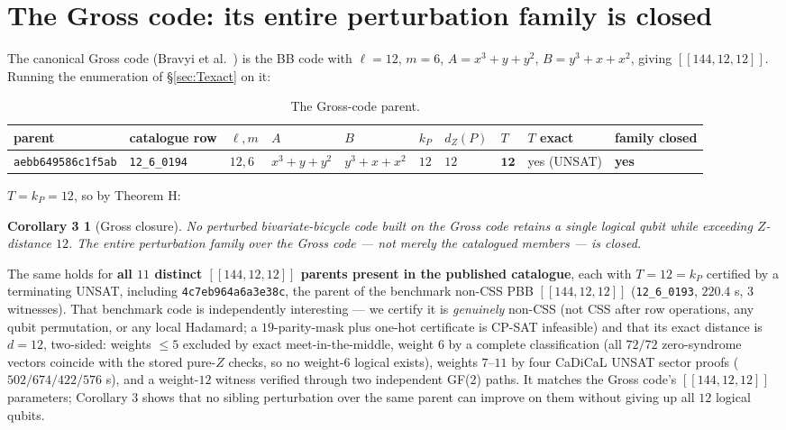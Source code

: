 \documentclass[11pt]{article}
\newcommand{\nk}[1]{[\![#1]\!]}
\theoremstyle{plain}
\newtheorem*{corthree}{Corollary 3}
\theoremstyle{remark}
\begin{document}
\section{The Gross code: its entire perturbation family is closed}\label{sec:gross}

The canonical Gross code (Bravyi et al.~\cite{bravyi2024faulttolerant}) is the BB code with
$\ell=12$, $m=6$, $A=x^3+y+y^2$, $B=y^3+x+x^2$, giving $\nk{144,12,12}$. Running the
enumeration of \S\ref{sec:Texact} on it:

\begin{table}[ht]
\centering
\footnotesize
\setlength{\tabcolsep}{3.5pt}
\caption{The Gross-code parent.}
\begin{tabular}{llllllllll}
\toprule
parent & catalogue row & $\ell,m$ & $A$ & $B$ & $k_P$ & $d_Z(P)$ & $T$ & $T$ exact & family closed \\
\midrule
\texttt{aebb649586c1f5ab} & \texttt{12\_6\_0194} & $12,6$ & $x^3+y+y^2$ & $y^3+x+x^2$ & $12$ & $12$ & $\mathbf{12}$ & yes (UNSAT) & \textbf{yes} \\
\bottomrule
\end{tabular}
\end{table}

$T=k_P=12$, so by Theorem H:

\begin{corthree}[Gross closure]
No perturbed bivariate-bicycle code built on the Gross
code retains a single logical qubit while exceeding $Z$-distance $12$. The entire
perturbation family over the Gross code --- not merely the catalogued members --- is closed.
\end{corthree}

The same holds for \textbf{all $11$ distinct $\nk{144,12,12}$ parents present in the published
catalogue}, each with $T=12=k_P$ certified by a terminating UNSAT, including
\texttt{4c7eb964a6a3e38c}, the parent of the benchmark non-CSS PBB $\nk{144,12,12}$
(\texttt{12\_6\_0193}, $220.4$ s, $3$ witnesses). That benchmark code is independently interesting
--- we certify it is \emph{genuinely} non-CSS (not CSS after row operations, any qubit
permutation, or any local Hadamard; a $19$-parity-mask plus one-hot certificate is
CP-SAT infeasible) and that its exact distance is $d=12$, two-sided: weights $\le 5$
excluded by exact meet-in-the-middle, weight $6$ by a complete classification (all
$72/72$ zero-syndrome vectors coincide with the stored pure-$Z$ checks, so no weight-$6$
logical exists), weights $7$--$11$ by four CaDiCaL UNSAT sector proofs
($502/674/422/576$ s), and a weight-$12$ witness verified through two independent GF(2)
paths. It matches the Gross code's $\nk{144,12,12}$
parameters; Corollary 3 shows that no sibling perturbation over the same parent can
improve on them without giving up all $12$ logical qubits.
\end{document}
